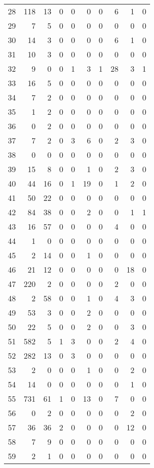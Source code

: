 \begin{tabular}{lrrrrrrrrr}
28 & 118 & 13 & 0 & 0 & 0 & 0 & 6 & 1 & 0 \\
29 & 7 & 5 & 0 & 0 & 0 & 0 & 0 & 0 & 0 \\
30 & 14 & 3 & 0 & 0 & 0 & 0 & 6 & 1 & 0 \\
31 & 10 & 3 & 0 & 0 & 0 & 0 & 0 & 0 & 0 \\
32 & 9 & 0 & 0 & 1 & 3 & 1 & 28 & 3 & 1 \\
33 & 16 & 5 & 0 & 0 & 0 & 0 & 0 & 0 & 0 \\
34 & 7 & 2 & 0 & 0 & 0 & 0 & 0 & 0 & 0 \\
35 & 1 & 2 & 0 & 0 & 0 & 0 & 0 & 0 & 0 \\
36 & 0 & 2 & 0 & 0 & 0 & 0 & 0 & 0 & 0 \\
37 & 7 & 2 & 0 & 3 & 6 & 0 & 2 & 3 & 0 \\
38 & 0 & 0 & 0 & 0 & 0 & 0 & 0 & 0 & 0 \\
39 & 15 & 8 & 0 & 0 & 1 & 0 & 2 & 3 & 0 \\
40 & 44 & 16 & 0 & 1 & 19 & 0 & 1 & 2 & 0 \\
41 & 50 & 22 & 0 & 0 & 0 & 0 & 0 & 0 & 0 \\
42 & 84 & 38 & 0 & 0 & 2 & 0 & 0 & 1 & 1 \\
43 & 16 & 57 & 0 & 0 & 0 & 0 & 4 & 0 & 0 \\
44 & 1 & 0 & 0 & 0 & 0 & 0 & 0 & 0 & 0 \\
45 & 2 & 14 & 0 & 0 & 1 & 0 & 0 & 0 & 0 \\
46 & 21 & 12 & 0 & 0 & 0 & 0 & 0 & 18 & 0 \\
47 & 220 & 2 & 0 & 0 & 0 & 0 & 2 & 0 & 0 \\
48 & 2 & 58 & 0 & 0 & 1 & 0 & 4 & 3 & 0 \\
49 & 53 & 3 & 0 & 0 & 2 & 0 & 0 & 0 & 0 \\
50 & 22 & 5 & 0 & 0 & 2 & 0 & 0 & 3 & 0 \\
51 & 582 & 5 & 1 & 3 & 0 & 0 & 2 & 4 & 0 \\
52 & 282 & 13 & 0 & 3 & 0 & 0 & 0 & 0 & 0 \\
53 & 2 & 0 & 0 & 0 & 1 & 0 & 0 & 2 & 0 \\
54 & 14 & 0 & 0 & 0 & 0 & 0 & 0 & 1 & 0 \\
55 & 731 & 61 & 1 & 0 & 13 & 0 & 7 & 0 & 0 \\
56 & 0 & 2 & 0 & 0 & 0 & 0 & 0 & 2 & 0 \\
57 & 36 & 36 & 2 & 0 & 0 & 0 & 0 & 12 & 0 \\
58 & 7 & 9 & 0 & 0 & 0 & 0 & 0 & 0 & 0 \\
59 & 2 & 1 & 0 & 0 & 0 & 0 & 0 & 0 & 0 \\

\end{tabular}
